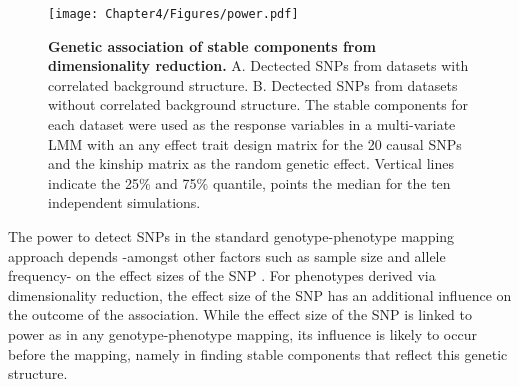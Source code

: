 \begin{figure}[hbtp]
	\centering
	\texttt{[image: Chapter4/Figures/power.pdf]}
	\caption[\textbf{Genetic association of stable components from dimensionality reduction.}]{\textbf{Genetic association of stable components from dimensionality reduction. } A. Dectected SNPs from datasets with correlated background structure. B.  Dectected SNPs from datasets without correlated background structure. The stable components for each dataset were used as the response variables in a multi-variate LMM with an any effect trait design matrix for the \num{20} causal SNPs and the kinship matrix as the random genetic effect. Vertical lines indicate the \num{25}\% and \num{75}\% quantile, points the median for the ten independent simulations. } 
	 	\label{fig:power-dimRed}
\end{figure}

The power to detect SNPs in the standard genotype-phenotype mapping approach depends -amongst other factors such as sample size and allele frequency- on the effect sizes of the SNP \citep{Cohen1992,Halsey2015,Astle2016}.  For phenotypes derived via dimensionality reduction, the effect size of the SNP has an additional influence on the outcome of the association.  While the effect size of the SNP is linked to power as in any genotype-phenotype mapping, its influence is likely to occur before the mapping, namely in finding stable components that reflect this genetic structure. 


